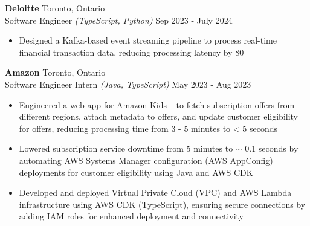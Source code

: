 \documentclass[a4paper]{article}
\begin{document}
\textbf{Deloitte} 
\hfill Toronto, Ontario \\
Software Engineer {\sl (TypeScript, Python)} \hfill Sep 2023 - July 2024 \\
\vspace{-1mm}
\begin{itemize} \itemsep 1pt
     \item Designed a Kafka-based event streaming pipeline to process real-time financial transaction data, reducing processing latency by 80%

 \end{itemize}
\vspace{-1.5mm}
 

\textbf{Amazon} 
\hfill Toronto, Ontario \\
Software Engineer Intern {\sl (Java, TypeScript)}
\hfill May 2023 - Aug 2023 \\
\vspace{-1mm}
\begin{itemize} \itemsep 1pt
        \item Engineered a web app for Amazon Kids+ to fetch subscription offers from different regions, attach metadata to offers, and update customer eligibility for offers, reducing processing time from 3 - 5 minutes to < 5 seconds
        \item Lowered subscription service downtime from 5 minutes to  $\sim$ 0.1 seconds by automating AWS Systems Manager configuration (AWS AppConfig) deployments for customer eligibility using Java and AWS CDK
        \item Developed and deployed Virtual Private Cloud (VPC) and AWS Lambda infrastructure using AWS CDK (TypeScript), ensuring secure connections by adding IAM roles for enhanced deployment and connectivity
\end{itemize}
\vspace{-1.25mm}
\end{document}
